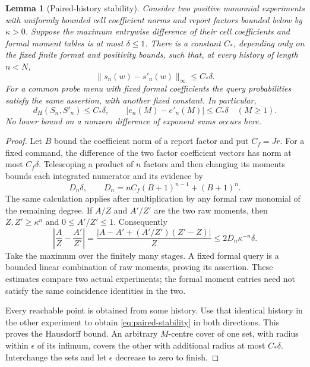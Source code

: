 \documentclass[11pt]{amsart}
\newtheorem{lemma}[theorem]{Lemma}
\theoremstyle{definition}\newtheorem{definition}[theorem]{Definition}
\theoremstyle{remark}\newtheorem{remark}[theorem]{Remark}
\begin{document}
\begin{lemma}[Paired-history stability]\label{lem:paired-history}
Consider two positive monomial experiments with uniformly bounded cell
coefficient norms and report factors bounded below by $\kappa>0$.
Suppose the maximum entrywise difference of their cell coefficients and
formal moment tables is at most $\delta\le1$. There is a constant $C_*$,
depending only on the fixed finite format and positivity bounds, such
that, at every history of length $n<N$,
\begin{equation}\label{eq:paired-stability}
 \|s_n(w)-s'_n(w)\|_\infty\le C_*\delta.
\end{equation}
For a common probe menu with fixed formal coefficients the query
probabilities satisfy the same assertion, with another fixed constant.
In particular,
\begin{equation}\label{eq:hausdorff-profile}
 d_H(S_n,S'_n)\le C_*\delta,\qquad
 |e_n(M)-e'_n(M)|\le C_*\delta\quad(M\ge1).
\end{equation}
No lower bound on a nonzero difference of exponent sums occurs here.
\end{lemma}
\begin{proof}
Let $B$ bound the coefficient norm of a report factor and put $C_f=Jr$.
For a fixed command, the difference of the two factor coefficient
vectors has norm at most $C_f\delta$. Telescoping a product of $n$
factors and then changing its moments bounds each integrated numerator
and its evidence by
\[
 D_n\delta,\qquad
 D_n=nC_f(B+1)^{n-1}+(B+1)^n.
\]
The same calculation applies after multiplication by any formal raw
monomial of the remaining degree. If $A/Z$ and $A'/Z'$ are the two
raw moments, then $Z,Z'\ge\kappa^n$ and $0\le A'/Z'\le1$.
Consequently
\[
 \left|\frac A Z-\frac{A'}{Z'}\right|
 =\frac{|A-A'+(A'/Z')(Z'-Z)|}{Z}
 \le 2D_n\kappa^{-n}\delta.
\]
Take the maximum over the finitely many stages. A fixed formal query
is a bounded linear combination of raw moments, proving its assertion.
These estimates compare two actual experiments; the formal moment
entries need not satisfy the same coincidence identities in the two.

Every reachable point is obtained from some history. Use that identical
history in the other experiment to obtain \eqref{eq:paired-stability}
in both directions. This proves the Hausdorff bound. An arbitrary
$M$-centre cover of one set, with radius within $\epsilon$ of its
infimum, covers the other with additional radius at most $C_*\delta$.
Interchange the sets and let $\epsilon$ decrease to zero to finish.
\end{proof}
\end{document}
